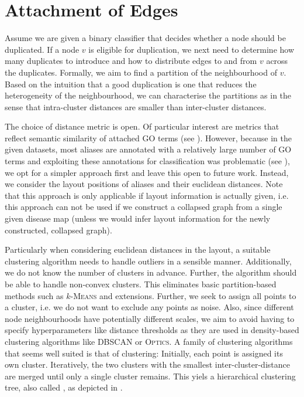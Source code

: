 \documentclass[
	fontsize=10pt, %
	twoside=true, %
	secnumdepth=1, %
  toc=indentunnumbered %
]{kaobook}
\begin{document}
\section{Attachment of Edges}
\label{sec:edge-attachment}


Assume we are given a binary classifier that decides whether a node should be
duplicated. If a node $v$ is eligible for duplication, we next need to determine
how many duplicates to introduce and how to distribute edges to and from $v$
across the duplicates. Formally, we aim to find a partition of the neighbourhood
of $v$. Based on the intuition that a good duplication is one that reduces the
heterogeneity of the neighbourhood, we can characterise the partitions as
 in the sense that intra-cluster distances are smaller than
inter-cluster distances.

The choice of distance metric is open. Of particular interest are metrics that
reflect semantic similarity of attached GO terms
(see ).
However, because in the given
datasets, most aliases are annotated with a relatively large number of GO terms
and exploiting these annotations for classification was problematic (see ),
we opt for a
simpler approach first and leave this open to future work. 
Instead, we consider the layout positions of aliases and their euclidean
distances. Note that this approach is only applicable if layout information is
actually given, i.e. this approach can not be used if we construct a collapsed
graph from a single given disease map (unless we would infer layout information
for the newly constructed, collapsed graph).

Particularly when considering euclidean distances in the layout, a suitable
clustering algorithm needs to handle outliers in a sensible manner.
Additionally, we do not know the number of clusters in advance. Further, the
algorithm should be able to handle non-convex clusters. This eliminates basic
partition-based methods such as $k$-\textsc{Means} and extensions.
%
Further, we seek to assign all points to a cluster, i.e. we do not want to
exclude any points as noise. Also, since different node neighbourhoods have
potentially different scales, we aim to avoid having to specify hyperparameters
like distance thresholds as they are used in density-based clustering algorithms
like \textsc{DBSCAN} or \textsc{Optics}.
%
A family of clustering algorithms that seems well suited is that of
 clustering: Initially, each point is assigned its own
cluster. Iteratively, the two clusters with the smallest inter-cluster-distance
are merged until only a single cluster remains. This yiels a hierarchical
clustering tree, also called , as depicted in
.
\end{document}
